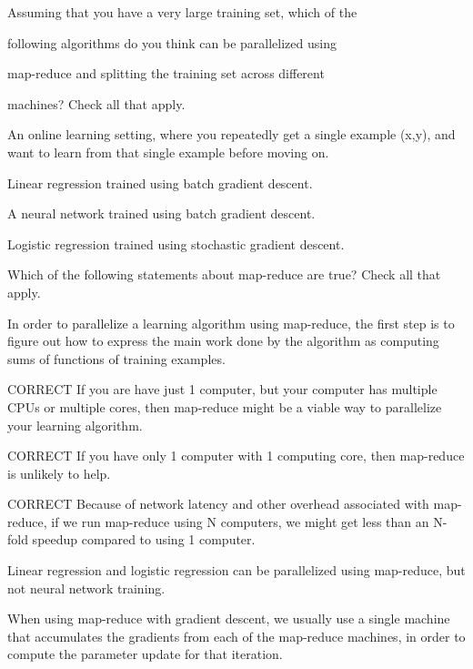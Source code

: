 \documentclass[11pt]{article} %
\begin{document}
Assuming that you have a very large training set, which of the

following algorithms do you think can be parallelized using

map-reduce and splitting the training set across different

machines? Check all that apply.

An online learning setting, where you repeatedly get a single example (x,y), and want to learn from that single example before moving on.

Linear regression trained using batch gradient descent.

A neural network trained using batch gradient descent.

Logistic regression trained using stochastic gradient descent.


Which of the following statements about map-reduce are true? Check all that apply.

In order to parallelize a learning algorithm using map-reduce, the first step is to figure out how to express the main work done by the algorithm as computing sums of functions of training examples.

CORRECT If you are have just 1 computer, but your computer has multiple CPUs or multiple cores, then map-reduce might be a viable way to parallelize your learning algorithm.

CORRECT If you have only 1 computer with 1 computing core, then map-reduce is unlikely to help.

CORRECT Because of network latency and other overhead associated with map-reduce, if we run map-reduce using N computers, we might get less than an N-fold speedup compared to using 1 computer.

Linear regression and logistic regression can be parallelized using map-reduce, but not neural network training.

When using map-reduce with gradient descent, we usually use a single machine that accumulates the gradients from each of the map-reduce machines, in order to compute the parameter update for that iteration.
\end{document}
